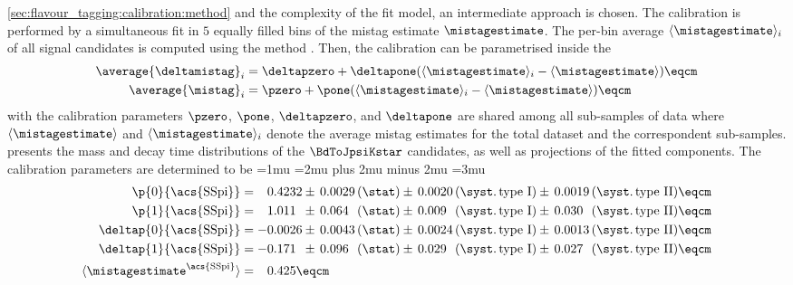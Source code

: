 \cref{sec:flavour_tagging:calibration:method} and the complexity of the fit model,
an intermediate approach is chosen. The calibration is performed by a
simultaneous fit in $\num{5}$ equally filled bins of the mistag estimate
$\mistagestimate$. The per-bin average $\langle\mistagestimate\rangle_i$ of all
signal candidates is computed using the \splot method \cite{Pivk:2004ty}. Then,
the calibration can be parametrised inside the \PDF
%
\begin{equation}
  \begin{split}
    \average{\deltamistag}_i  &= \deltapzero + \deltapone ( \langle\mistagestimate\rangle_i - \langle\mistagestimate\rangle )\eqcm \\
    \average{\mistag}_i       &= \pzero + \pone ( \langle\mistagestimate\rangle_i - \langle\mistagestimate\rangle )\eqcm
  \end{split}
\end{equation}
%
with the calibration parameters $\pzero$, $\pone$, $\deltapzero$, and
$\deltapone$ are shared among all sub-samples of data where
$\langle\mistagestimate\rangle$ and $\langle\mistagestimate\rangle_i$ denote the
average mistag estimates for the total dataset and the correspondent
sub-samples.  presents the mass and
decay time distributions of the $\BdToJpsiKstar$ candidates, as well as
projections of the fitted \PDF components. The calibration parameters are
determined to be
%
\begingroup
  \thinmuskip=1mu
  \medmuskip=2mu plus 2mu minus 2mu
  \thickmuskip=3mu
\begin{equation*}\label{eq:flavour_tagging:calibration:ss:parameters}
  \begin{split}
    \p{0}{\text{\acs{SSpi}}}        &= \phantom{+}0.4232 \pm\, 
                                       0.0029 \text{\,(\stat)} \pm\, 
                                       0.0020 \text{\,(\syst.\,type I)} \pm\, 
                                       0.0019 \text{\,(\syst.\,type II)} \eqcm\\ %
    \p{1}{\text{\acs{SSpi}}}        &= \phantom{+}1.011\phantom{0} \pm\, 
                                       0.064\phantom{0} \text{\,(\stat)} \pm\, 
                                       0.009\phantom{0} \text{\,(\syst.\,type I)} \pm\, 
                                       0.030\phantom{0} \text{\,(\syst.\,type II)} \eqcm\\ %
    \deltap{0}{\text{\acs{SSpi}}} &= -0.0026 \pm\, 
                                      0.0043 \text{\,(\stat)} \pm\, 
                                      0.0024 \text{\,(\syst.\,type I)} \pm\, 
                                      0.0013 \text{\,(\syst.\,type II)} \eqcm \\
    \deltap{1}{\text{\acs{SSpi}}} &= -0.171\phantom{0} \pm\, 
                                      0.096\phantom{0} \text{\,(\stat)} \pm\, 
                                      0.029\phantom{0} \text{\,(\syst.\,type I)} \pm\, 
                                      0.027\phantom{0} \text{\,(\syst.\,type II)} \eqcm \\
    \langle\mistagestimate^{\text{\acs{SSpi}}}\rangle &= \phantom{+}0.425 \eqcm
  \end{split}
\end{equation*}
